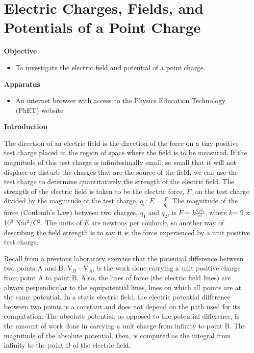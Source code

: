 
\section{Electric Charges, Fields, and Potentials of a Point Charge}

\makelabheader %

\textbf{Objective}

\begin{itemize}
\item To investigate the electric field and potential of a point charge.
\end{itemize}

\textbf{Apparatus}

\begin{itemize}
\item An internet browser with access to the Physics Education Technology (PhET) website
\end{itemize}

\textbf{Introduction}

The direction of an electric field is the direction of the force on
a tiny positive test charge placed in the region of space where the
field is to be measured. If the magnitude of this test charge is infinitesimally
small, so small that it will not displace or disturb the charges that
are the source of the field, we can use the test charge to determine
quantitatively the strength of the electric field. The strength of
the electric field is taken to be the electric force, $F$, on the test
charge divided by the magnitude of the test charge, \( q_{t} \):
\( E=\frac{F}{q_{t}} \). The magnitude of the force (Coulomb's Law) between two charges,
\( q_{1} \) and \( q_{2} \), is \( F=k\frac{q_{1}q_{2}}{r^{2}} \),
where \( k \)= 9 x 10\( ^{9} \) Nm\( ^{2} \)/C\( ^{2} \). The units
of \( E \) are newtons per coulomb, so another way of describing the field
strength is to say it is the force experienced by a unit positive
test charge.

Recall from a previous laboratory exercise that the potential difference
between two points A and B, V\( _{B} \) - V\( _{A} \), is the work
done carrying a unit positive charge from point A to point B. Also,
the lines of force (the electric field lines) are always perpendicular
to the equipotential lines, lines on which all points are at the same
potential. In a static electric field, the electric potential difference
between two points is a constant and does not depend on the path used
for its computation. The absolute potential, as opposed to the potential
difference, is the amount of work done in carrying a unit charge from
infinity to point B. The magnitude of the absolute potential, then,
is computed as the integral from infinity to the point B of the electric
field.

